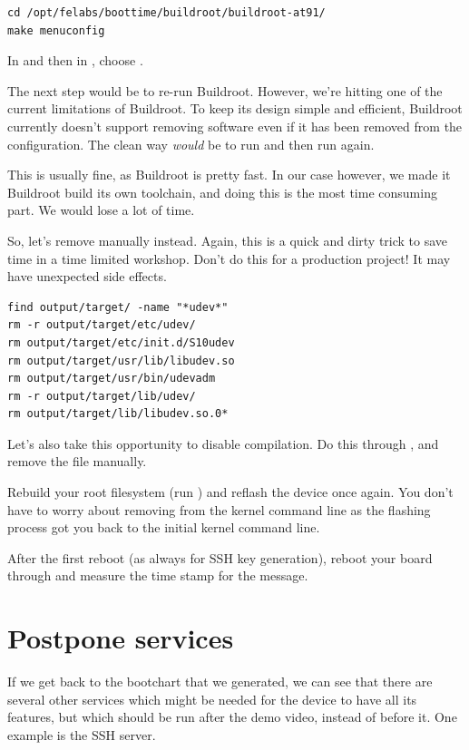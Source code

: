 \begin{verbatim}
cd /opt/felabs/boottime/buildroot/buildroot-at91/
make menuconfig
\end{verbatim}

In  and then in ,
choose .

The next step would be to re-run Buildroot. However, we're hitting one
of the current limitations of Buildroot. To keep its design simple and
efficient, Buildroot currently doesn't support removing software
even if it has been removed from the configuration. The clean way 
{\em would} be to run  and then run 
again.

This is usually fine, as Buildroot is pretty fast. In our case however,
we made it Buildroot build its own toolchain, and doing this is the most
time consuming part. We would lose a lot of time. 

So, let's remove  manually instead. Again, this is a quick
and dirty trick to save time in a time limited workshop. Don't do this
for a production project! It may have unexpected side effects.

\begin{verbatim}
find output/target/ -name "*udev*" 
rm -r output/target/etc/udev/
rm output/target/etc/init.d/S10udev 
rm output/target/usr/lib/libudev.so 
rm output/target/usr/bin/udevadm 
rm -r output/target/lib/udev/
rm output/target/lib/libudev.so.0*
\end{verbatim}

Let's also take this opportunity to disable 
compilation. Do this through , and remove
the  file manually.

Rebuild your root filesystem (run ) and reflash the device once again.
You don't have to worry about removing  from the kernel
command line as the flashing process got you back to the initial kernel
command line.

After the first reboot (as always for SSH key generation), reboot your
board through  and measure the time stamp for the
 message.

\section{Postpone services}

If we get back to the bootchart that we generated, we can see that there
are several other services which might be needed for the device to 
have all its features, but which should be run after the demo video,
instead of before it. One example is the SSH server.

